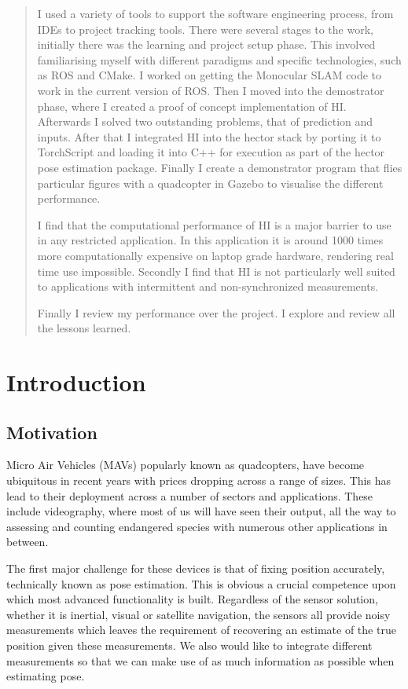 \documentclass[]{../resources/final_report}
\begin{document}
\begin{abstract}
I used a variety of tools to support the software engineering process, from IDEs to project tracking tools. There were several stages to the work, initially there was the learning and project setup phase. This involved familiarising myself with different paradigms and specific technologies, such as ROS and CMake. I worked on getting the Monocular SLAM code to work in the current version of ROS. Then I moved into the demostrator phase, where I created a proof of concept implementation of HI. Afterwards I solved two outstanding problems, that of prediction and inputs. After that I integrated HI into the hector stack by porting it to TorchScript and loading it into C++ for execution as part of the hector pose estimation package. Finally I create a demonstrator program that flies particular figures with a quadcopter in Gazebo to visualise the different 
performance.

I find that the computational performance of HI is a major barrier to use in any restricted application. In this application it is around 1000 times more computationally expensive on laptop grade hardware, rendering real time use impossible. Secondly I find that HI is not particularly well suited to applications with intermittent and non-synchronized measurements.

Finally I review my performance over the project. I explore and review all the lessons learned.


\end{abstract}
\newpage

\chapter{Introduction}


\section{Motivation}

Micro Air Vehicles (MAVs) popularly known as quadcopters, have become ubiquitous in recent years with prices dropping across a range of sizes. This has lead to their deployment across a number of sectors and applications. These include videography, where most of us will have seen their output, all the way to assessing and counting endangered species with numerous other applications in between.

The first major challenge for these devices is that of fixing position accurately, technically known as pose estimation. This is obvious a crucial competence upon which most advanced functionality is built. Regardless of the sensor solution, whether it is inertial, visual or satellite navigation, the sensors all provide noisy measurements which leaves the requirement of recovering an estimate of the true position given these measurements. We also would like to integrate different measurements so that we can make use of as much information as possible when estimating pose. 
\end{document}
